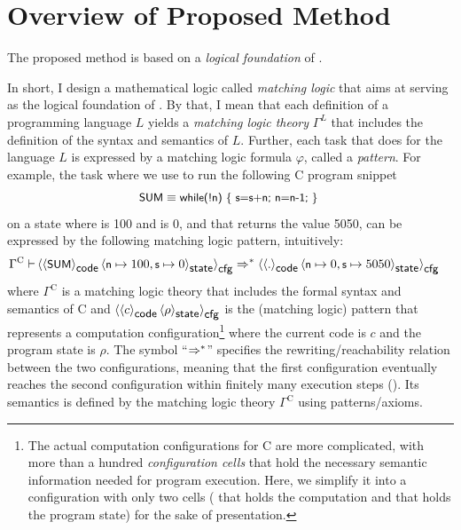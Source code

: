 \documentclass[11pt]{article}
\begin{document}
\section{Overview of Proposed Method}
\label{sec:method}

The proposed method is based on a \emph{logical foundation} of \K.

In short, I design a mathematical logic called \emph{matching logic} that aims 
at serving as the logical foundation of \K. 
By that, I mean that each \K definition of a programming language $L$
yields a \emph{matching logic theory} $\Gamma^L$ that includes the definition
of
the syntax and semantics of $L$. 
Further, each task that \K does for the language $L$ 
is expressed by a matching logic formula $\varphi$, called a \emph{pattern}. 
For example, the task where we use \K to run the following C program snippet
$$
\code{SUM} \equiv \code{while(!n) \{ s=s+n; n=n-1; \} }
$$
on a state where  is 100 and  is 0,
and that \K returns the value 5050, can be expressed by the 
following 
matching logic pattern, intuitively:
{\allowdisplaybreaks[0]\begin{align}
\Gamma^\textrm{C} \vdash
& \cell[cfg]{\cell[code]{\code{SUM}} \cell[state]{\code{n}\mapsto 100, 
\code{s}\mapsto 0}} \To^*
\cell[cfg]{\cell[code]{\code{.}} \cell[state]{\code{n}\mapsto 0, 
\code{s}\mapsto 5050}}
\label{eq:po-exe-sum}
\end{align}}%
where $\Gamma^\textrm{C}$ is a matching logic theory that includes the formal 
syntax and semantics of C
and $\cell[cfg]{\cell[code]{c} \cell[state]{\rho}}$
is the (matching logic) pattern that represents a computation configuration\footnote{The actual computation configurations for C are more complicated, with more than a hundred \emph{configuration cells} that 
hold the necessary semantic information needed for program execution.
Here, we simplify it into a configuration with only two cells 
( that holds the computation and  that holds the program state) for the sake of presentation.}
where the current code is $c$ and the program state is $\rho$. 
The symbol ``$\To^*$'' specifies the rewriting/reachability relation
between the two configurations, meaning that the first configuration
eventually reaches the second configuration within finitely many execution steps ().
Its semantics is defined by the matching logic theory $\Gamma^\textrm{C}$ using
patterns/axioms.
\end{document}
